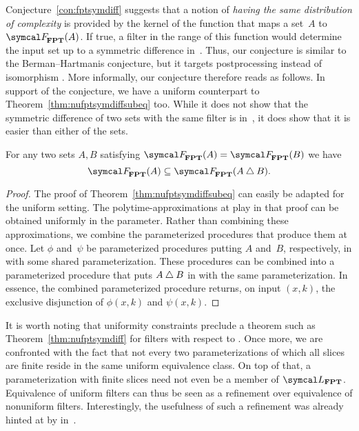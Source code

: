Conjecture~\ref{con:fptsymdiff} suggests that a notion of \emph{having the same distribution of complexity} is provided by the kernel of the function that maps a set~$A$ to $\calF_\cl{FPT}(A)$.
If true, a filter in the range of this function would determine the input set up to a symmetric difference in~.
Thus, our conjecture is similar to the Berman--Hartmanis conjecture, but it targets postprocessing instead of isomorphism \parencite[see also][]{agrawal2009one}.
More informally, our conjecture therefore reads as follows.
In support of the conjecture, we have a uniform counterpart to Theorem~\ref{thm:nufptsymdiffsubeq} too.
While it does not show that the symmetric difference of two sets with the same filter is in~, it does show that it is easier than either of the sets.
\begin{theorem}
  For any two sets $A, B$ satisfying $\calF_\cl{FPT}(A) = \calF_\cl{FPT}(B)$ we have
  \begin{equation*}
    \calF_\cl{FPT}(A) \subseteq \calF_\cl{FPT}(A \symdiff B).
  \end{equation*}
\end{theorem}
\begin{proof}
  The proof of Theorem~\ref{thm:nufptsymdiffsubeq} can easily be adapted for the uniform setting.
  The polytime-approximations at play in that proof can be obtained uniformly in the parameter.
  Rather than combining these approximations, we combine the parameterized procedures that produce them at once.
  Let $\phi$ and~$\psi$ be parameterized procedures putting $A$ and~$B$, respectively, in  with some shared parameterization.
  These procedures can be combined into a parameterized procedure that puts $A \bigtriangleup B$ in  with the same parameterization.
  In essence, the combined parameterized procedure returns, on input $(x, k)$, the exclusive disjunction of $\phi(x, k)$ and $\psi(x, k)$.
\end{proof}

It is worth noting that uniformity constraints preclude a theorem such as Theorem~\ref{thm:nufptsymdiff} for filters with respect to .
Once more, we are confronted with the fact that not every two parameterizations of which all slices are finite reside in the same uniform equivalence class.
On top of that, a parameterization with finite slices need not even be a member of $\calL_\cl{FPT}$.
Equivalence of uniform filters can thus be seen as a refinement over equivalence of nonuniform filters.
Interestingly, the usefulness of such a refinement was already hinted at by \textcite{orponen1986classification} in~\citeyear{orponen1986classification}.

